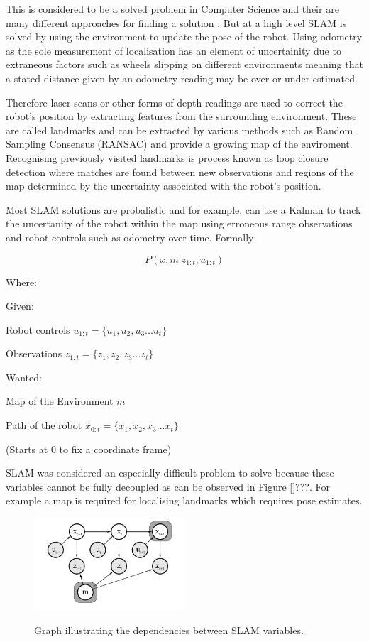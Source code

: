 \documentclass{mproj}
\begin{document}
This is considered to be a solved problem in Computer Science and their are many different approaches for finding a solution \cite{Hugh2006}. But at a high level SLAM is solved by using the environment to update the pose of the robot. Using odometry as the sole measurement of localisation has an element of uncertainity due to extraneous factors such as wheels slipping on different environments meaning that a stated distance given by an odometry reading may be over or under estimated. 

Therefore laser scans or other forms of depth readings are used to correct the robot's position by extracting features from the surrounding environment. These are called landmarks and can be extracted by various methods such as Random Sampling Consensus (RANSAC) and provide a growing map of the enviroment. Recognising previously visited landmarks is process known as loop closure detection where matches are found between new observations  and regions of the map determined by the uncertainty associated  with the robot’s position\cite{labbe13appearance}.

Most SLAM solutions are probalistic and for example, can use a Kalman to track the uncertanity of the robot within the map using erroneous range observations and robot controls such as odometry over time. Formally:

\[ \textit{P}\left(x, m | z_{1:t}, u_{1:t}\right) \]

Where:

Given:

Robot controls $ u_{1:t} = \lbrace u_{1}, u_{2}, u_{3} ... u_{t} \rbrace $

Observations $ z_{1:t} = \lbrace z_{1}, z_{2}, z_{3} ... z_{t} \rbrace $

Wanted:

Map of the Environment $ m $

Path of the robot $ x_{0:t} = \lbrace x_{1}, x_{2}, x_{3} ... x_{t} \rbrace $

(Starts at 0 to fix a coordinate frame)


SLAM was considered an especially difficult problem to solve \cite{Hugh1988} because these variables cannot be fully decoupled as can be observed in Figure []???. For example a map is required for localising landmarks  which requires pose estimates.

\begin{figure}[h]
  \caption{Graph illustrating the dependencies between SLAM variables.}
  \centering
  \includegraphics[width=0.5\textwidth]{images/slam_graph.png}
  \label{fig:SLAM Graph}
\end{figure}
\end{document}
